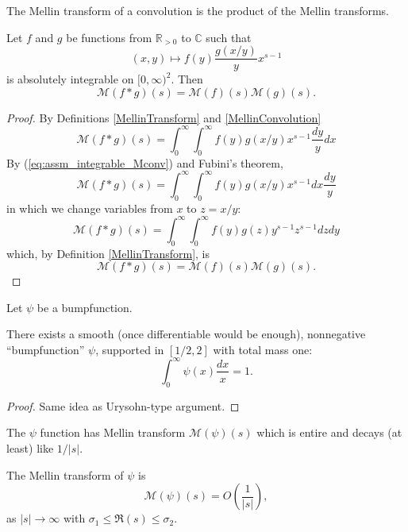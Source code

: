 The Mellin transform of a convolution is the product of the Mellin transforms.
\begin{theorem}[MellinConvolutionTransform]\label{MellinConvolutionTransform}
\leanok
Let $f$ and $g$ be functions from $\mathbb{R}_{>0}$ to $\mathbb{C}$ such that
\begin{equation}
  (x,y)\mapsto f(y)\frac{g(x/y)}yx^{s-1}
  \label{eq:assm_integrable_Mconv}
\end{equation}
is absolutely integrable on $[0,\infty)^2$.
Then
$$\mathcal{M}(f\ast g)(s) = \mathcal{M}(f)(s)\mathcal{M}(g)(s).$$
\end{theorem}


\begin{proof}
By Definitions \ref{MellinTransform} and \ref{MellinConvolution}
$$
  \mathcal M(f\ast g)(s)=
  \int_0^\infty \int_0^\infty f(y)g(x/y)x^{s-1}\frac{dy}ydx
$$
By (\ref{eq:assm_integrable_Mconv}) and Fubini's theorem,
$$
  \mathcal M(f\ast g)(s)=
  \int_0^\infty \int_0^\infty f(y)g(x/y)x^{s-1}dx\frac{dy}y
$$
in which we change variables from $x$ to $z=x/y$:
$$
  \mathcal M(f\ast g)(s)=
  \int_0^\infty \int_0^\infty f(y)g(z)y^{s-1}z^{s-1}dzdy
$$
which, by Definition \ref{MellinTransform}, is
$$
  \mathcal M(f\ast g)(s)=
  \mathcal M(f)(s)\mathcal M(g)(s)
  .
$$

\end{proof}


Let $\psi$ be a bumpfunction.
\begin{theorem}[SmoothExistence]\label{SmoothExistence}\leanok
There exists a smooth (once differentiable would be enough), nonnegative ``bumpfunction'' $\psi$,
 supported in $[1/2,2]$ with total mass one:
$$
\int_0^\infty \psi(x)\frac{dx}{x} = 1.
$$
\end{theorem}


\begin{proof}\leanok
{}
Same idea as Urysohn-type argument.
\end{proof}


The $\psi$ function has Mellin transform $\mathcal{M}(\psi)(s)$ which is entire and decays (at
least) like $1/|s|$.
\begin{theorem}[MellinOfPsi]\label{MellinOfPsi}\leanok
The Mellin transform of $\psi$ is
$$\mathcal{M}(\psi)(s) =  O\left(\frac{1}{|s|}\right),$$
as $|s|\to\infty$ with $\sigma_1 \le \Re(s) \le \sigma_2$.
\end{theorem}

